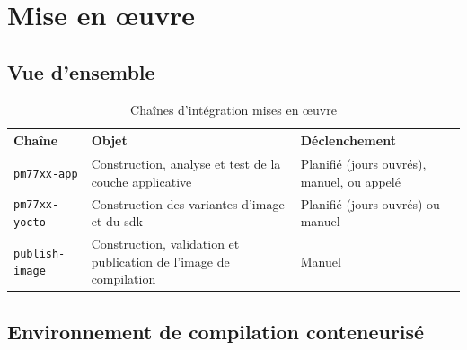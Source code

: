 %
\chapter{Mise en œuvre}
\label{chap:mise-en-oeuvre}

\section{Vue d'ensemble}
\label{sec:impl-vue-ensemble}


\begin{table}[H]
\centering
\caption{Chaînes d'intégration mises en œuvre}
\label{tab:impl-workflows}
\begin{tabularx}{\textwidth}{@{}l X >{\raggedright\arraybackslash}p{3.6cm}@{}}
\toprule
\textbf{Chaîne} & \textbf{Objet} & \textbf{Déclenchement} \\
\midrule
\texttt{pm77xx-app} & Construction, analyse et test de la couche applicative &
  Planifié (jours ouvrés), manuel, ou appelé \\
\texttt{pm77xx-yocto} & Construction des variantes d'image et du \gls{sdk} &
  Planifié (jours ouvrés) ou manuel \\
\texttt{publish-image} & Construction, validation et publication de l'image de
  compilation & Manuel \\
\bottomrule
\end{tabularx}
\end{table}


\section{Environnement de compilation conteneurisé}
\label{sec:impl-conteneur}

